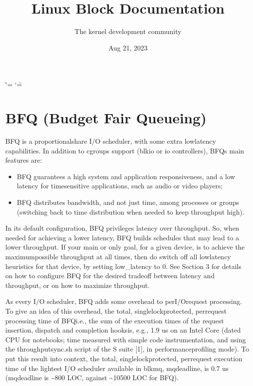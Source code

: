 \documentclass[a4paper,11pt,english]{sphinxmanual}
\title{Linux Block Documentation}
\date{Aug 21, 2023}
\author{The kernel development community}
\begin{document}
\ifdefined\shorthandoff
  \ifnum\catcode`\=\string=\active\shorthandoff{=}\fi
  \ifnum\catcode`\"=\active{}\fi
\fi

\pagestyle{empty}
\sphinxmaketitle
\pagestyle{plain}
\sphinxtableofcontents
\pagestyle{normal}
\label{\detokenize{index::doc}}



\chapter{BFQ (Budget Fair Queueing)}
\label{\detokenize{bfq-iosched:bfq-budget-fair-queueing}}\label{\detokenize{bfq-iosched::doc}}
BFQ is a proportional\sphinxhyphen{}share I/O scheduler, with some extra
low\sphinxhyphen{}latency capabilities. In addition to cgroups support (blkio or io
controllers), BFQ\textquotesingle{}s main features are:
\begin{itemize}
\item {} 
BFQ guarantees a high system and application responsiveness, and a
low latency for time\sphinxhyphen{}sensitive applications, such as audio or video
players;

\item {} 
BFQ distributes bandwidth, and not just time, among processes or
groups (switching back to time distribution when needed to keep
throughput high).

\end{itemize}

In its default configuration, BFQ privileges latency over
throughput. So, when needed for achieving a lower latency, BFQ builds
schedules that may lead to a lower throughput. If your main or only
goal, for a given device, is to achieve the maximum\sphinxhyphen{}possible
throughput at all times, then do switch off all low\sphinxhyphen{}latency heuristics
for that device, by setting low\_latency to 0. See Section 3 for
details on how to configure BFQ for the desired tradeoff between
latency and throughput, or on how to maximize throughput.

As every I/O scheduler, BFQ adds some overhead to per\sphinxhyphen{}I/O\sphinxhyphen{}request
processing. To give an idea of this overhead, the total,
single\sphinxhyphen{}lock\sphinxhyphen{}protected, per\sphinxhyphen{}request processing time of BFQ\sphinxhyphen{}\sphinxhyphen{}\sphinxhyphen{}i.e., the
sum of the execution times of the request insertion, dispatch and
completion hooks\sphinxhyphen{}\sphinxhyphen{}\sphinxhyphen{}is, e.g., 1.9 us on an Intel Core 
(dated CPU for notebooks; time measured with simple code
instrumentation, and using the throughput\sphinxhyphen{}sync.sh script of the S
suite {[}1{]}, in performance\sphinxhyphen{}profiling mode). To put this result into
context, the total, single\sphinxhyphen{}lock\sphinxhyphen{}protected, per\sphinxhyphen{}request execution time
of the lightest I/O scheduler available in blk\sphinxhyphen{}mq, mq\sphinxhyphen{}deadline, is 0.7
us (mq\sphinxhyphen{}deadline is \textasciitilde{}800 LOC, against \textasciitilde{}10500 LOC for BFQ).
\end{document}
